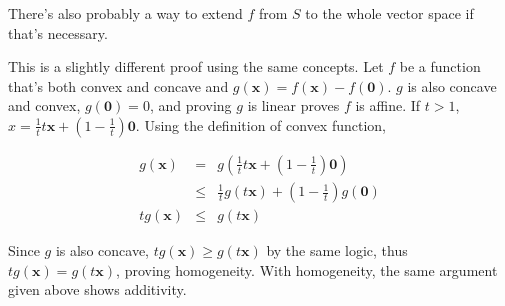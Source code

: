 \documentclass[12pt]{article}
\newtheorem{axiom}{Axiom}
\begin{document}
There's also probably a way to extend $f$ from $S$ to the whole vector
space if that's necessary.


This is a slightly different proof using the same concepts.  Let $f$
be a function that's both convex and concave and $g(\mathbf{x}) =
f(\mathbf{x}) - f(\mathbf{0})$.  $g$ is also concave and convex,
$g(\mathbf{0}) = 0$, and proving $g$ is linear proves $f$ is affine.
If $t > 1$, $x = \frac{1}{t} t\mathbf{x} + (1 - \frac{1}{t})
\mathbf{0}$.  Using the definition of convex function,

\begin{eqnarray*}
  g(\mathbf{x}) & = & g\left(\frac{1}{t} t\mathbf{x} + \left(1 -
      \frac{1}{t}\right) \mathbf{0}\right)\\
  & \leq & \frac{1}{t} g(t\mathbf{x}) + (1 - \frac{1}{t})
  g(\mathbf{0})\\
  t g(\mathbf{x}) & \leq & g(t\mathbf{x})
\end{eqnarray*}

Since $g$ is also concave, $tg(\mathbf{x}) \geq g(t\mathbf{x})$ by the
same logic, thus $tg(\mathbf{x}) = g(t\mathbf{x})$, proving
homogeneity.  With homogeneity, the same argument given above shows
additivity.







\end{document}
